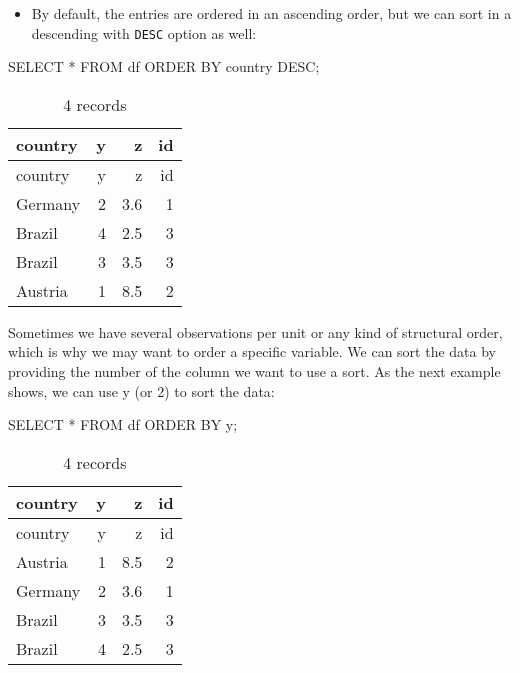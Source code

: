 \documentclass[
  letterpaper,
  DIV=11,
  numbers=noendperiod]{scrreprt}
\newenvironment{Shaded}{\begin{snugshade}}{\end{snugshade}}
\newcommand{\KeywordTok}[1]{\textcolor[rgb]{0.00,0.23,0.31}{#1}}
\newcommand{\NormalTok}[1]{\textcolor[rgb]{0.00,0.23,0.31}{#1}}
\newcommand{\OperatorTok}[1]{\textcolor[rgb]{0.37,0.37,0.37}{#1}}
\providecommand{\tightlist}{%
  \setlength{\itemsep}{0pt}\setlength{\parskip}{0pt}}\usepackage{longtable,booktabs,array}
\begin{document}
\begin{itemize}
\tightlist
\item
  By default, the entries are ordered in an ascending order, but we can
  sort in a descending with \texttt{DESC} option as well:
\end{itemize}

\begin{Shaded}
\begin{Highlighting}[]
\KeywordTok{SELECT} \OperatorTok{*} \KeywordTok{FROM}\NormalTok{ df }\KeywordTok{ORDER} \KeywordTok{BY}\NormalTok{ country }\KeywordTok{DESC}\NormalTok{;}
\end{Highlighting}
\end{Shaded}

\begin{longtable}[]{@{}lrrr@{}}
\caption{4 records}\tabularnewline
\toprule()
country & y & z & id \\
\midrule()
\endfirsthead
\toprule()
country & y & z & id \\
\midrule()
\endhead
Germany & 2 & 3.6 & 1 \\
Brazil & 4 & 2.5 & 3 \\
Brazil & 3 & 3.5 & 3 \\
Austria & 1 & 8.5 & 2 \\
\bottomrule()
\end{longtable}

Sometimes we have several observations per unit or any kind of
structural order, which is why we may want to order a specific variable.
We can sort the data by providing the number of the column we want to
use a sort. As the next example shows, we can use y (or 2) to sort the
data:

\begin{Shaded}
\begin{Highlighting}[]
\KeywordTok{SELECT} \OperatorTok{*} \KeywordTok{FROM}\NormalTok{ df }\KeywordTok{ORDER} \KeywordTok{BY}\NormalTok{ y;}
\end{Highlighting}
\end{Shaded}

\begin{longtable}[]{@{}lrrr@{}}
\caption{4 records}\tabularnewline
\toprule()
country & y & z & id \\
\midrule()
\endfirsthead
\toprule()
country & y & z & id \\
\midrule()
\endhead
Austria & 1 & 8.5 & 2 \\
Germany & 2 & 3.6 & 1 \\
Brazil & 3 & 3.5 & 3 \\
Brazil & 4 & 2.5 & 3 \\
\bottomrule()
\end{longtable}
\end{document}
